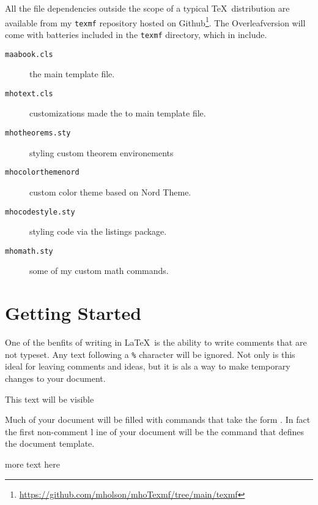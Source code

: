 All the file dependencies outside the scope of a typical \TeX\, distribution
are available from my \texttt{texmf} repository hosted on
Github\footnote{\url{https://github.com/mholson/mhoTexmf/tree/main/texmf}}.
The Overleaf\texttrademark version will come with batteries included in the 
\texttt{texmf} directory, which in include.  
\begin{description}
    \item[\texttt{maabook.cls}] the main template file.
    \item[\texttt{mhotext.cls}] customizations made the to main template file.
    \item[\texttt{mhotheorems.sty}] styling custom theorem environements
    \item[\texttt{mhocolorthemenord}] custom color theme based on Nord Theme.
    \item[\texttt{mhocodestyle.sty}] styling code via the listings package.
    \item[\texttt{mhomath.sty}] some of my custom math commands.  
\end{description}


\section{Getting Started}

One of the benfits of writing in \LaTeX\, is the ability to write comments
that are not typeset.  Any text following a \verb!%! character will be 
ignored.  Not only is this ideal for leaving comments and ideas, but it is 
als a way to make temporary changes to your document.
\begin{mhotexbox}
This text will be visible %
\end{mhotexbox}
Much of your document will be filled with commands that take the form 
. In fact the first non-comment l
ine of your document will be the command that defines the document template.
more text here
